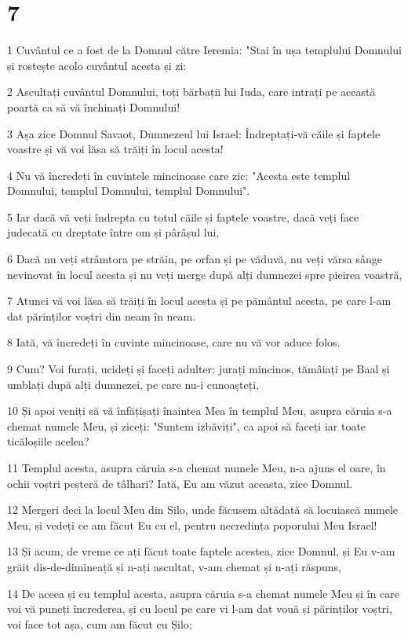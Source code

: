 \chapter{7}

\par 1 Cuvântul ce a fost de la Domnul către Ieremia: "Stai în ușa templului Domnului și rostește acolo cuvântul acesta și zi:
\par 2 Ascultați cuvântul Domnului, toți bărbații lui Iuda, care intrați pe această poartă ca să vă închinați Domnului!
\par 3 Așa zice Domnul Savaot, Dumnezeul lui Israel: Îndreptați-vă căile și faptele voastre și vă voi lăsa să trăiți în locul acesta!
\par 4 Nu vă încredeți în cuvintele mincinoase care zic: "Acesta este templul Domnului, templul Domnului, templul Domnului".
\par 5 Iar dacă vă veți îndrepta cu totul căile și faptele voastre, dacă veți face judecată cu dreptate între om și pârâșul lui,
\par 6 Dacă nu veți strâmtora pe străin, pe orfan și pe văduvă, nu veți vărsa sânge nevinovat în locul acesta și nu veți merge după alți dumnezei spre pieirea voastră,
\par 7 Atunci vă voi lăsa să trăiți în locul acesta și pe pământul acesta, pe care l-am dat părinților voștri din neam în neam.
\par 8 Iată, vă încredeți în cuvinte mincinoase, care nu vă vor aduce folos.
\par 9 Cum? Voi furați, ucideți și faceți adulter; jurați mincinos, tămâiați pe Baal și umblați după alți dumnezei, pe care nu-i cunoașteți,
\par 10 Și apoi veniți să vă înfățișați înaintea Mea în templul Meu, asupra căruia s-a chemat numele Meu, și ziceți: "Suntem izbăviți", ca apoi să faceți iar toate ticăloșiile acelea?
\par 11 Templul acesta, asupra căruia s-a chemat numele Meu, n-a ajuns el oare, în ochii voștri peșteră de tâlhari? Iată, Eu am văzut aceasta, zice Domnul.
\par 12 Mergeri deci la locul Meu din Silo, unde făcusem altădată să locuiască numele Meu, și vedeți ce am făcut Eu cu el, pentru necredința poporului Meu Israel!
\par 13 Și acum, de vreme ce ați făcut toate faptele acestea, zice Domnul, și Eu v-am grăit dis-de-dimineață și n-ați ascultat, v-am chemat și n-ați răspuns,
\par 14 De aceea și cu templul acesta, asupra căruia s-a chemat numele Meu și în care voi vă puneți încrederea, și cu locul pe care vi l-am dat vouă și părinților voștri, voi face tot așa, cum am făcut cu Șilo;
